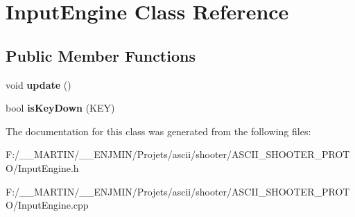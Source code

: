 \hypertarget{class_input_engine}{}\section{Input\+Engine Class Reference}
\label{class_input_engine}
\subsection*{Public Member Functions}
\begin{DoxyCompactItemize}
\item 
\hypertarget{class_input_engine_ab4eacde9d5826d436bc2f62b241f5fd9}{}\label{class_input_engine_ab4eacde9d5826d436bc2f62b241f5fd9} 
void {\bfseries update} ()
\item 
\hypertarget{class_input_engine_a83ec547886c948af86305bc9fd576b63}{}\label{class_input_engine_a83ec547886c948af86305bc9fd576b63} 
bool {\bfseries is\+Key\+Down} (K\+EY)
\end{DoxyCompactItemize}


The documentation for this class was generated from the following files\+:\begin{DoxyCompactItemize}
\item 
F\+:/\+\_\+\+\_\+\+M\+A\+R\+T\+I\+N/\+\_\+\+\_\+\+E\+N\+J\+M\+I\+N/\+Projets/ascii/shooter/\+A\+S\+C\+I\+I\+\_\+\+S\+H\+O\+O\+T\+E\+R\+\_\+\+P\+R\+O\+T\+O/Input\+Engine.\+h\item 
F\+:/\+\_\+\+\_\+\+M\+A\+R\+T\+I\+N/\+\_\+\+\_\+\+E\+N\+J\+M\+I\+N/\+Projets/ascii/shooter/\+A\+S\+C\+I\+I\+\_\+\+S\+H\+O\+O\+T\+E\+R\+\_\+\+P\+R\+O\+T\+O/Input\+Engine.\+cpp\end{DoxyCompactItemize}
